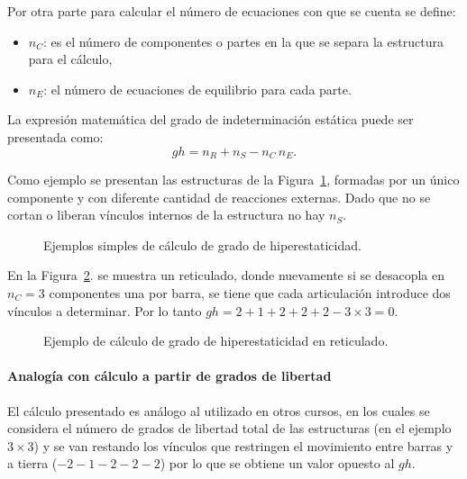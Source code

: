 Por otra parte para calcular el número de ecuaciones con que se cuenta se define:
%
\begin{itemize}
	\item $n_C$: es el número de componentes o partes en la que se separa la estructura para el cálculo,
	\item $n_E$: el número de ecuaciones de equilibrio para cada parte.
	\end{itemize}

La expresión matemática del grado de indeterminación estática puede ser presentada como:
%
\begin{equation} \label{eqn:gradoh}
gh = n_R + n_S - n_C \, n_{E}.
\end{equation}

{\cambio Como ejemplo se presentan las estructuras de la Figura~\ref{fig:ejemghSimp}, formadas por un único componente y con diferente cantidad de reacciones externas. Dado que no se cortan o liberan vínculos internos de la estructura no hay $n_S$.}

\begin{figure}[htb]
\centering
 \def\svgwidth{0.95\textwidth}
  
  \caption{Ejemplos simples de cálculo de grado de hiperestaticidad.}
  \label{fig:ejemghSimp}
\end{figure}

{\cambio En la Figura~\ref{fig:ejemghMed}. se muestra un reticulado, donde nuevamente si se desacopla en $n_C=3$ componentes una por barra, se tiene que cada articulación introduce dos vínculos a determinar. Por lo tanto $gh = 2+1+2+2+2-3\times 3 = 0$.}

\begin{figure}[htb]
	\centering
	\def\svgwidth{0.6\textwidth}
	
	\caption{Ejemplo de cálculo de grado de hiperestaticidad en reticulado.}
	\label{fig:ejemghMed}
\end{figure}

{\cambio 
\paragraph{Analogía con cálculo a partir de grados de libertad} %
El cálculo presentado es análogo al utilizado en otros cursos, en los cuales se considera el número de grados de libertad total de las estructuras (en el ejemplo $3\times 3$) y se van restando los vínculos que restringen el movimiento entre barras y a tierra ($-2-1-2-2-2$) por lo que se obtiene un valor opuesto al $gh$.
}

